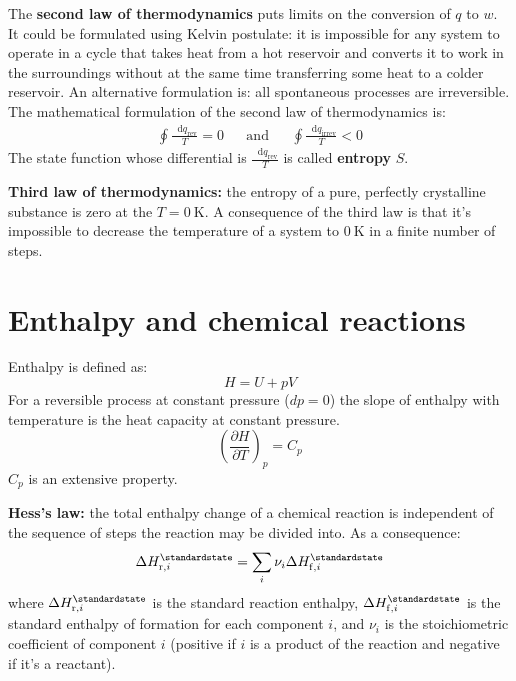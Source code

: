 \documentclass[12pt,a4paper]{report}
\newcommand*\diff{\mathop{}\!\mathrm{d}}
\begin{document}
   The \textbf{second law of thermodynamics} puts limits on the conversion of $q$ to $w$. It could be formulated using Kelvin postulate: it is impossible for any system to operate in a cycle that takes heat from a hot reservoir and converts it to work in the surroundings without at the same time transferring some heat to a colder reservoir. An alternative formulation is: all spontaneous processes are irreversible.
   The mathematical formulation of the second law of thermodynamics is:
   \begin{align*}
   \oint\frac{\diff q_{\mathrm{rev}}}{T}=0 &&\mathrm{and}&& \oint\frac{\diff q_{\mathrm{irrev}}}{T}<0
   \end{align*}
   The state function whose differential is $\frac{\diff q_{\mathrm{rev}}}{T}$ is called \textbf{entropy} $S$.
   
   \textbf{Third law of thermodynamics:} the entropy of a pure, perfectly crystalline substance is zero at the $T=0\:\mathrm{K}$. A consequence of the third law is that it's impossible to decrease the temperature of a system to $0\:\mathrm{K}$ in a finite number of steps.
   \section*{Enthalpy and chemical reactions}
   Enthalpy is defined as:
   \begin{equation*}
   H=U+pV
   \end{equation*}
   For a reversible process at constant pressure ($dp=0$) the slope of enthalpy with temperature is the heat capacity at constant pressure. 
   \begin{equation*}
   \left(\frac{\partial H}{\partial T}\right)_{p}=C_{p}
   \end{equation*}
   $C_{p}$ is an extensive property.
   
   \textbf{Hess's law:} the total enthalpy change of a chemical reaction is independent of the sequence of steps the reaction may be divided into. As a consequence:
   \begin{equation*}
   \Delta H^{\standardstate}_{\mathrm{r}, i}=\sum\limits_{i}\nu_{i}\Delta H^{\standardstate}_{\mathrm{f},i}
   \end{equation*}
   where $\Delta H^{\standardstate}_{\mathrm{r}, i}$ is the standard reaction enthalpy, $\Delta H^{\standardstate}_{\mathrm{f},i}$ is the standard enthalpy of formation for each component $i$, and $\nu_{i}$ is the stoichiometric coefficient of component $i$ (positive if $i$ is a product of the reaction and negative if it's a reactant).
\end{document}
